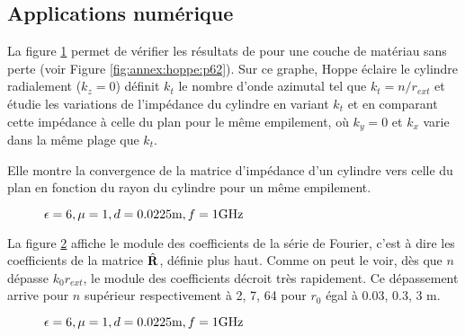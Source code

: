   \subsection{Applications numérique}

    La figure \ref{fig:imp_fourier:cylindre:hoppe_p62:converge_rayon} permet de vérifier les résultats de \cite[p.~62]{hoppe_impedance_1995} pour une couche de matériau sans perte (voir Figure \ref{fig:annex:hoppe:p62}). Sur ce graphe, Hoppe éclaire le cylindre radialement (\(k_z=0\)) définit \(k_t\) le nombre d'onde azimutal tel que \(k_t = n \slash r_{ext}\) et étudie les variations de l'impédance du cylindre en variant \(k_t\) et en comparant cette impédance à celle du plan pour le même empilement, où \(k_y= 0\) et \(k_x\) varie dans la même plage que \(k_t\).

    Elle montre la convergence de la matrice d'impédance d'un cylindre vers celle du plan en fonction du rayon du cylindre pour un même empilement. 
    \begin{figure}[!hbt]
      \centering
      
      \caption{\(\epsilon = 6, \mu = 1, d=0.0225\text{m}, f=1\text{GHz}\)}
      \label{fig:imp_fourier:cylindre:hoppe_p62:converge_rayon}
    \end{figure}

    La figure \ref{fig:imp_fourier:cylindre:hoppe_p62:coeff_fourier} affiche le module des coefficients de la série de Fourier, c'est à dire les coefficients de la matrice \(\hat{\mathbf{R}}\), définie plus haut. Comme on peut le voir, dès que \(n\) dépasse \(k_0r_{ext}\), le module des coefficients décroit très rapidement. Ce dépassement arrive pour \(n\) supérieur respectivement à 2, 7, 64 pour \(r_0\) égal à 0.03, 0.3, 3 m.

    \begin{figure}[!hbt]
      \centering
      
      \caption{\(\epsilon = 6, \mu = 1, d=0.0225\text{m}, f=1\text{GHz}\)}
      \label{fig:imp_fourier:cylindre:hoppe_p62:coeff_fourier}
    \end{figure}